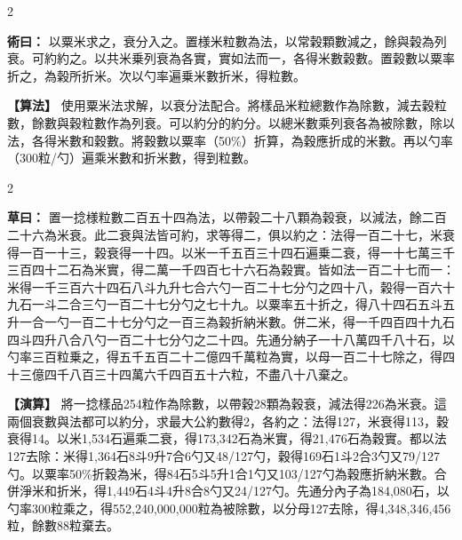 \documentclass[11pt,a4paper]{article}
\newcommand{\ClassicalMethod}[1]{\par\noindent\textbf{\color{methodcolor}術曰：}#1\par}
\newcommand{\ClassicalWorking}[1]{\par\noindent\textbf{草曰：}#1\par}
\newcommand{\ModernMethod}[1]{\par\noindent\textbf{\color{methodcolor}【算法】}#1\par}
\newcommand{\ModernWorking}[1]{\par\noindent\textbf{【演算】}#1\par}
\begin{document}
\begin{paracol}{2}

\ClassicalMethod{%
以粟米求之，衰分入之。置様米粒數為法，以常榖顆數減之，餘與榖為列衰。可約約之。以共米乗列衰為各實，實如法而一，各得米數榖數。置榖數以粟率折之，為榖所折米。次以勺率遍乗米數折米，得粒數。}

\switchcolumn

\ModernMethod{%
使用粟米法求解，以衰分法配合。將樣品米粒總數作為除數，減去穀粒數，餘數與穀粒數作為列衰。可以約分的約分。以總米數乘列衰各為被除數，除以法，各得米數和穀數。將穀數以粟率（50\%）折算，為穀應折成的米數。再以勺率（300粒/勺）遍乘米數和折米數，得到粒數。
}

\end{paracol}

\begin{paracol}{2}

\ClassicalWorking{%
置一捻様粒數二百五十四為法，以帶榖二十八顆為榖衰，以減法，餘二百二十六為米衰。此二衰與法皆可約，求等得二，俱以約之：法得一百二十七，米衰得一百一十三，榖衰得一十四。以米一千五百三十四石遍乗二衰，得一十七萬三千三百四十二石為米實，得二萬一千四百七十六石為榖實。皆如法一百二十七而一：米得一千三百六十四石八斗九升七合六勺一百二十七分勺之四十八，榖得一百六十九石一斗二合三勺一百二十七分勺之七十九。以粟率五十折之，得八十四石五斗五升一合一勺一百二十七分勺之一百三為榖折納米數。併二米，得一千四百四十九石四斗四升八合八勺一百二十七分勺之二十四。先通分納子一十八萬四千八十石，以勺率三百粒乗之，得五千五百二十二億四千萬粒為實，以母一百二十七除之，得四十三億四千八百三十四萬六千四百五十六粒，不盡八十八棄之。}

\switchcolumn

\ModernWorking{%
將一捻樣品254粒作為除數，以帶穀28顆為穀衰，減法得226為米衰。這兩個衰數與法都可以約分，求最大公約數得2，各約之：法得127，米衰得113，穀衰得14。以米1,534石遍乘二衰，得173,342石為米實，得21,476石為穀實。都以法127去除：米得1,364石8斗9升7合6勺又48/127勺，穀得169石1斗2合3勺又79/127勺。以粟率50\%折穀為米，得84石5斗5升1合1勺又103/127勺為穀應折納米數。合併淨米和折米，得1,449石4斗4升8合8勺又24/127勺。先通分內子為184,080石，以勺率300粒乘之，得552,240,000,000粒為被除數，以分母127去除，得4,348,346,456粒，餘數88粒棄去。
}

\end{paracol}



\newpage
\end{document}
